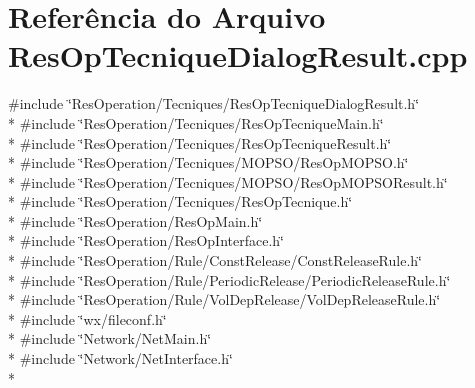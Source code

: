 \section{Referência do Arquivo Res\+Op\+Tecnique\+Dialog\+Result.\+cpp}
\label{_tecniques_2_res_op_tecnique_dialog_result_8cpp}
{\ttfamily \#include \char`\"{}Res\+Operation/\+Tecniques/\+Res\+Op\+Tecnique\+Dialog\+Result.\+h\char`\"{}}\\*
{\ttfamily \#include \char`\"{}Res\+Operation/\+Tecniques/\+Res\+Op\+Tecnique\+Main.\+h\char`\"{}}\\*
{\ttfamily \#include \char`\"{}Res\+Operation/\+Tecniques/\+Res\+Op\+Tecnique\+Result.\+h\char`\"{}}\\*
{\ttfamily \#include \char`\"{}Res\+Operation/\+Tecniques/\+M\+O\+P\+S\+O/\+Res\+Op\+M\+O\+P\+S\+O.\+h\char`\"{}}\\*
{\ttfamily \#include \char`\"{}Res\+Operation/\+Tecniques/\+M\+O\+P\+S\+O/\+Res\+Op\+M\+O\+P\+S\+O\+Result.\+h\char`\"{}}\\*
{\ttfamily \#include \char`\"{}Res\+Operation/\+Tecniques/\+Res\+Op\+Tecnique.\+h\char`\"{}}\\*
{\ttfamily \#include \char`\"{}Res\+Operation/\+Res\+Op\+Main.\+h\char`\"{}}\\*
{\ttfamily \#include \char`\"{}Res\+Operation/\+Res\+Op\+Interface.\+h\char`\"{}}\\*
{\ttfamily \#include \char`\"{}Res\+Operation/\+Rule/\+Const\+Release/\+Const\+Release\+Rule.\+h\char`\"{}}\\*
{\ttfamily \#include \char`\"{}Res\+Operation/\+Rule/\+Periodic\+Release/\+Periodic\+Release\+Rule.\+h\char`\"{}}\\*
{\ttfamily \#include \char`\"{}Res\+Operation/\+Rule/\+Vol\+Dep\+Release/\+Vol\+Dep\+Release\+Rule.\+h\char`\"{}}\\*
{\ttfamily \#include \char`\"{}wx/fileconf.\+h\char`\"{}}\\*
{\ttfamily \#include \char`\"{}Network/\+Net\+Main.\+h\char`\"{}}\\*
{\ttfamily \#include \char`\"{}Network/\+Net\+Interface.\+h\char`\"{}}\\*

